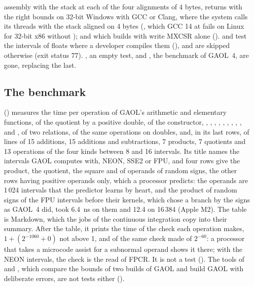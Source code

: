assembly with the stack at each of the four alignments of 4 bytes, returns
with the right bounds on 32-bit Windows with GCC or Clang, where the system
calls its threads with the stack aligned on 4 bytes
(, which GCC 14 at
 fails on Linux for 32-bit x86 without );
and which builds with  write MXCSR alone
().\newinvfive{}
 and  test the intervals of floats where a
developer compiles them (), and are skipped
otherwise (exit status 77). , an empty test,
 and , the benchmark of
GAOL~4, are gone,  replacing the last.\newinvfive

\subsection{The benchmark}
%

 () measures the time per
operation of GAOL's arithmetic and elementary functions, of the quotient by a
positive double, of the constructor, , ,
, , , ,
, , ,
 and , of two relations, of the same
operations on doubles, and, in its last rows, of lines of 15 additions, 15
additions and subtractions, 7 products, 7 quotients and 13 operations of the
four kinds between 8 and 16 intervals.\newinvfive{} Its title names the
intervals GAOL computes with, NEON, SSE2 or FPU, and four rows give the
product, the quotient, the square and  of operands of random
signs, the other rows having positive operands only, which a processor
predicts: the operands are 1\,024 intervals that the predictor learns by
heart, and the product of random signs of the FPU intervals before their
kernels, which chose a branch by the signs as GAOL~4 did, took 6.4~ns on them
and 12.4 on 16\,384 (Apple M2). The table is Markdown, which the jobs of the
continuous integration copy into their summary. After the table, it prints
the time of the check each operation makes, $1+(2^{-1060}+0)$ not above 1,
and of the same check made of $2^{-60}$: a processor that takes a microcode
assist for a subnormal operand shows it there; with the NEON intervals, the
check is the read of FPCR. It is not a test (). The
tools of  and , which
compare the bounds of two builds of GAOL and build GAOL with deliberate
errors, are not tests either ().

